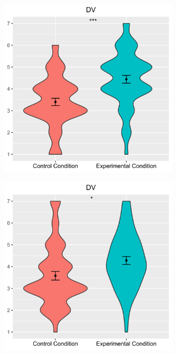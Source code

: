 \begin{figure}[h]
    \centering
    
    \begin{subfigure}{0.48\linewidth}
        \includegraphics[width=\linewidth,height=0.3\textheight]{images/Study 1/DV 1.png}
    \end{subfigure}
    \hfill
    \begin{subfigure}{0.48\linewidth}
        \includegraphics[width=\linewidth,height=0.3\textheight]{images/Study 1/DV 2.png}
    \end{subfigure}


\end{figure}
